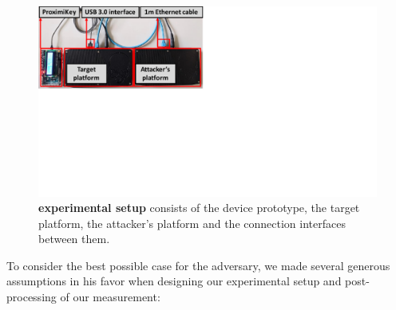 \begin{figure}[t]
  \centering
    \includegraphics[trim={0 11cm 17cm 0}, clip, width=0.8\linewidth]{chapters/ProximiTEE/figures/Setup2.pdf}
    \caption[\name experimental setup]{\textbf{\name experimental setup} consists of the \device device prototype, the target platform, the attacker's platform and the connection interfaces between them.}

    \label{fig:setup}
\end{figure}

To consider the best possible case for the adversary, we made several generous assumptions in his favor when designing our experimental setup and post-processing of our measurement:

